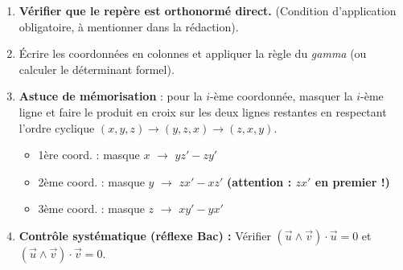 \documentclass[11pt]{article}
\begin{document}
\begin{methode}
\begin{enumerate}
\item \textbf{Vérifier que le repère est orthonormé direct.} (Condition d'application obligatoire, à mentionner dans la rédaction).
\item Écrire les coordonnées en colonnes et appliquer la règle du \emph{gamma} (ou calculer le déterminant formel).
\item \textbf{Astuce de mémorisation} : pour la $i$-ème coordonnée, masquer la $i$-ème ligne et faire le produit en croix sur les deux lignes restantes en respectant l'ordre cyclique $(x,y,z) \to (y,z,x) \to (z,x,y)$.
  \begin{itemize}
  \item 1ère coord. : masque $x$ $\to$ $y z' - z y'$
  \item 2ème coord. : masque $y$ $\to$ $z x' - x z'$ \textbf{(attention : $z x'$ en premier !)}
  \item 3ème coord. : masque $z$ $\to$ $x y' - y x'$
  \end{itemize}
\item \textbf{Contrôle systématique (réflexe Bac) :} Vérifier $(\vec{u}\wedge\vec{v})\cdot\vec{u}=0$ et $(\vec{u}\wedge\vec{v})\cdot\vec{v}=0$.
\end{enumerate}
\end{methode}
\end{document}
